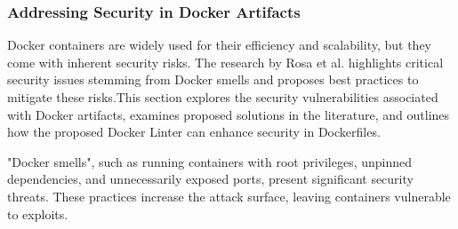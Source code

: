 \subsubsection{Addressing Security in Docker Artifacts}
Docker containers are widely used for their efficiency and scalability, but they come with inherent security risks. The research by Rosa et al. highlights critical security issues stemming from Docker smells and proposes best practices to mitigate these risks\cite{DockerArtifacts}.This section explores the security vulnerabilities associated with Docker artifacts, examines proposed solutions in the literature, and outlines how the proposed Docker Linter can enhance security in Dockerfiles.

"Docker smells", such as running containers with root privileges, unpinned dependencies, and unnecessarily exposed ports, present significant security threats. These practices increase the attack surface, leaving containers vulnerable to exploits.\cite{Dockeranalysis}

